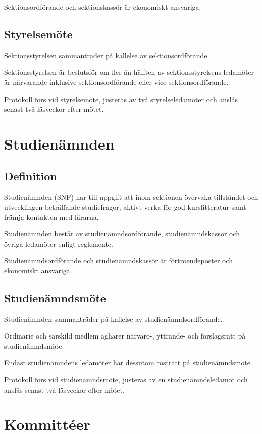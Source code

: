 \documentclass{styrdokument}
\begin{document}
\? Sektionsordförande och sektionskassör är ekonomiskt ansvariga.

\subsection{Styrelsemöte}

\? Sektionsstyrelsen sammanträder på kallelse av sektionsordförande.

\? Sektionsstyrelsen är beslutsför om fler än hälften av sektionsstyrelsens ledamöter är närvarande inklusive sektionsordförande eller vice sektionsordförande.

\? Protokoll förs vid styrelsemöte, justeras av två styrelseledamöter och anslås senast två läsveckor efter mötet.

\section{Studienämnden}
\subsection{Definition}

\? Studienämnden (SNF) har till uppgift att inom sektionen övervaka tillståndet och utvecklingen beträffande studiefrågor, aktivt verka för god kurslitteratur samt främja kontakten med lärarna.

\? Studienämnden består av studienämndsordförande, studienämndskassör och övriga ledamöter enligt reglemente.

\? Studienämndsordförande och studienämndskassör är förtroendeposter och ekonomiskt ansvariga.

\subsection{Studienämndsmöte}

\? Studienämnden sammanträder på kallelse av studienämndsordförande.

\? Ordinarie och särskild medlem ägharer närvaro-, yttrande- och förslagsrätt på studienämndsmöte.
\label{ratt.snf}

\? Endast studienämndens ledamöter har dessutom rösträtt på studienämndsmöte.

\? Protokoll förs vid studienämndsmöte, justeras av en studienämndsledamot och anslås senast två läsveckor efter mötet.

\section{Kommittéer}
\end{document}
